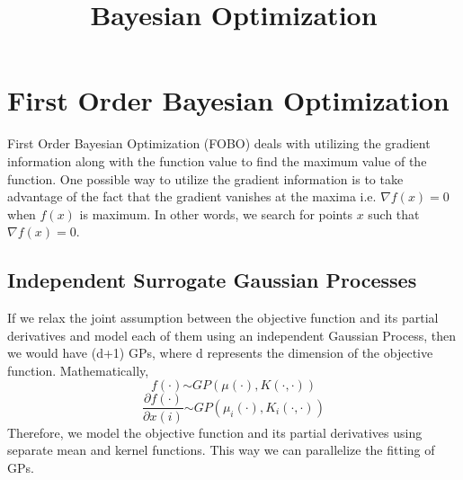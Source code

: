 \documentclass{article}
\title{Bayesian Optimization}
\begin{document}
\maketitle
\section{First Order Bayesian Optimization}
First Order Bayesian Optimization (FOBO) deals with utilizing the gradient information along with the function value to find the maximum value of the function.
One possible way to utilize the gradient information is to take advantage of the fact that the gradient vanishes at the maxima i.e. $\nabla f(x) = 0$ when 
$f(x)$ is maximum. In other words, we search for points $x$ such that $\nabla f(x) = 0$. \\
    \subsection{Independent Surrogate Gaussian Processes}
        If we relax the joint assumption between the objective function and its partial derivatives and model each of them using an independent Gaussian 
        Process, then we would have (d+1) GPs, where d represents the dimension of the objective function. Mathematically,
        \begin{equation}
			f(\cdot) \stackrel{}{\sim} GP(\mu(\cdot), K(\cdot , \cdot))
		\end{equation}
        \begin{equation}
			\frac{\partial f(\cdot)}{\partial x(i)} \stackrel{}{\sim} GP(\mu_{i}(\cdot), K_{i}(\cdot , \cdot))
		\end{equation}
        Therefore, we model the objective function and its partial derivatives using separate mean and kernel functions. This way we can parallelize the 
        fitting of GPs.
\end{document}
